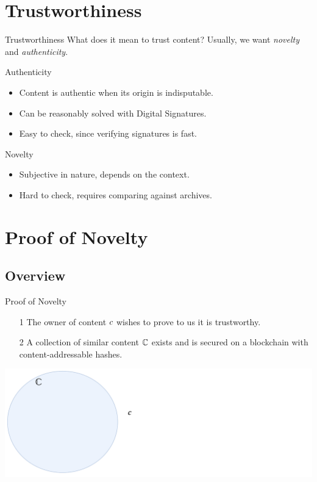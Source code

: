 \documentclass{beamer}
\begin{document}
\section{Trustworthiness}
\begin{frame}{Trustworthiness}
    What does it mean to trust content? \pause Usually, we want \emph{novelty} and \emph{authenticity}.
    \vfill
    \pause
    \begin{block}{Authenticity}
        \pause
        \begin{itemize}
            \item Content is authentic when its origin is indisputable.\pause
            \item Can be reasonably solved with Digital Signatures.\pause
            \item Easy to check, since verifying signatures is fast.
        \end{itemize}
    \end{block}
    
    \vfill
    
    \pause
    \begin{block}{Novelty}
        \pause
        \begin{itemize}
            \item Subjective in nature, depends on the context.\pause
            \item Hard to check, requires comparing against archives.
        \end{itemize}
    \end{block}
\end{frame}

\section{Proof of Novelty}
\subsection{Overview}
\begin{frame}{Proof of Novelty}
    \begin{enumerate}
        \item[1] The owner of content ${c}$ wishes to prove to us it is trustworthy.
        \item[2] A collection of similar content ${{\mathbb{C}}}$ exists and is secured on a blockchain with content-addressable hashes.
    \end{enumerate}
    \vfill
    \includegraphics[width=1.0\textwidth]{assets/pon-diagram-0.pdf}
\end{frame}
\end{document}
